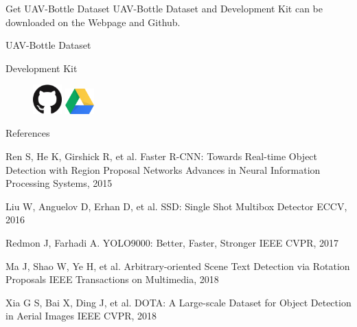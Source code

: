 \documentclass[newPxFont, fullfooter, sectionpages, progressbar]{beamer}
\begin{document}
\begin{frame}[c]{Get UAV-Bottle Dataset}
	\vspace{10mm}
	UAV-Bottle Dataset and Development Kit can be downloaded on the Webpage and Github. \\
\vspace{1em}
\begin{center}
	\large{UAV-Bottle Dataset}

	\large{Development Kit}
	\vspace{1.5em}

	\begin{figure}
		\centerline{
			\includegraphics[width=0.1\textwidth]{images/GitHub-Mark-120px-plus.png}
			\hspace{1.5cm}
			\includegraphics[width=0.1\textwidth]{images/Google_Drive_Logo.png}
			}
	\end{figure}
	
\end{center}
\end{frame}



\begin{frame}{References}
	\begin{thebibliography}{10}
	\scriptsize
	
	
	\beamertemplatearticlebibitems
	Ren S, He K, Girshick R, et al.
	\newblock Faster R-CNN: Towards Real-time Object Detection with Region Proposal Networks
	\newblock Advances in Neural Information Processing Systems, 2015
	
	\beamertemplatearticlebibitems
	Liu W, Anguelov D, Erhan D, et al.
	\newblock SSD: Single Shot Multibox Detector
	\newblock ECCV, 2016
	
	\beamertemplatearticlebibitems
	Redmon J, Farhadi A.
	\newblock YOLO9000: Better, Faster, Stronger
	\newblock IEEE CVPR, 2017

	\beamertemplatearticlebibitems
	Ma J, Shao W, Ye H, et al.
	\newblock Arbitrary-oriented Scene Text Detection via Rotation Proposals
	\newblock IEEE Transactions on Multimedia, 2018
	

	\beamertemplatearticlebibitems
	Xia G S, Bai X, Ding J, et al.
	\newblock DOTA: A Large-scale Dataset for Object Detection in Aerial Images
	\newblock IEEE CVPR, 2018
	
	
  \end{thebibliography}
\end{frame}
\end{document}
